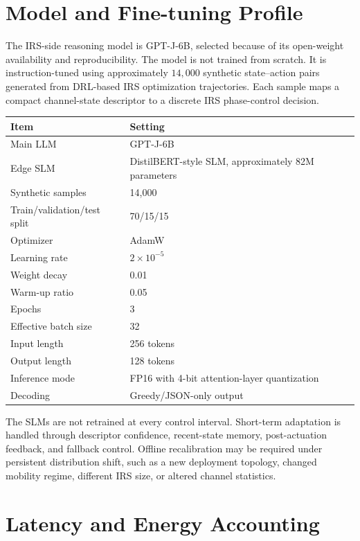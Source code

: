 \documentclass[11pt]{article}
\begin{document}
\section{Model and Fine-tuning Profile}

The IRS-side reasoning model is GPT-J-6B, selected because of its open-weight availability and reproducibility. The model is not trained from scratch. It is instruction-tuned using approximately $14,000$ synthetic state--action pairs generated from DRL-based IRS optimization trajectories. Each sample maps a compact channel-state descriptor to a discrete IRS phase-control decision.

\begin{center}
\begin{tabular}{ll}
\toprule
Item & Setting \\
\midrule
Main LLM & GPT-J-6B \\
Edge SLM & DistilBERT-style SLM, approximately 82M parameters \\
Synthetic samples & 14,000 \\
Train/validation/test split & 70/15/15 \\
Optimizer & AdamW \\
Learning rate & $2\times10^{-5}$ \\
Weight decay & 0.01 \\
Warm-up ratio & 0.05 \\
Epochs & 3 \\
Effective batch size & 32 \\
Input length & 256 tokens \\
Output length & 128 tokens \\
Inference mode & FP16 with 4-bit attention-layer quantization \\
Decoding & Greedy/JSON-only output \\
\bottomrule
\end{tabular}
\end{center}

The SLMs are not retrained at every control interval. Short-term adaptation is handled through descriptor confidence, recent-state memory, post-actuation feedback, and fallback control. Offline recalibration may be required under persistent distribution shift, such as a new deployment topology, changed mobility regime, different IRS size, or altered channel statistics.

\section{Latency and Energy Accounting}
\end{document}
